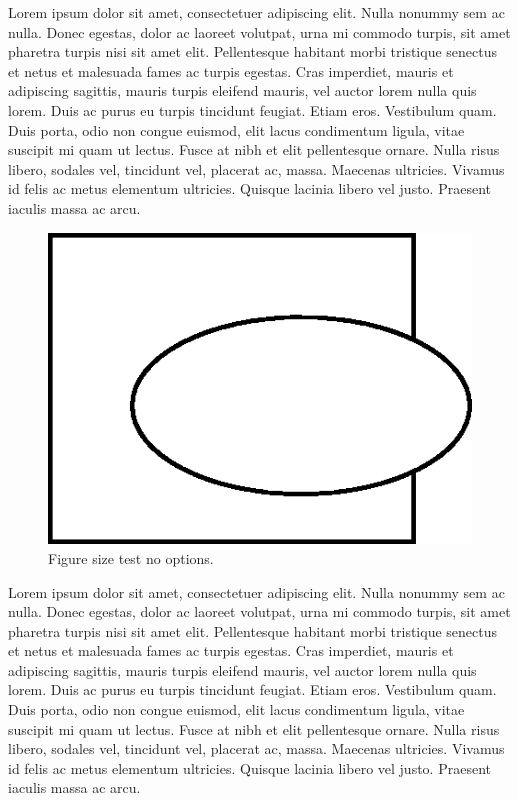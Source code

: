 \documentclass{article}
\begin{document}
Lorem ipsum dolor sit amet, consectetuer adipiscing elit. Nulla nonummy sem ac nulla. Donec egestas, dolor ac laoreet volutpat, urna mi commodo turpis, sit amet pharetra turpis nisi sit amet elit. Pellentesque habitant morbi tristique senectus et netus et malesuada fames ac turpis egestas. Cras imperdiet, mauris et adipiscing sagittis, mauris turpis eleifend mauris, vel auctor lorem nulla quis lorem. Duis ac purus eu turpis tincidunt feugiat. Etiam eros. Vestibulum quam. Duis porta, odio non congue euismod, elit lacus condimentum ligula, vitae suscipit mi quam ut lectus. Fusce at nibh et elit pellentesque ornare. Nulla risus libero, sodales vel, tincidunt vel, placerat ac, massa. Maecenas ultricies. Vivamus id felis ac metus elementum ultricies. Quisque lacinia libero vel justo. Praesent iaculis massa ac arcu.

\begin{figure}
\begin{center}
\includegraphics{fig_oval.png}
\caption{Figure size test no options.} 
\end{center}
\end{figure}

Lorem ipsum dolor sit amet, consectetuer adipiscing elit. Nulla nonummy sem ac nulla. Donec egestas, dolor ac laoreet volutpat, urna mi commodo turpis, sit amet pharetra turpis nisi sit amet elit. Pellentesque habitant morbi tristique senectus et netus et malesuada fames ac turpis egestas. Cras imperdiet, mauris et adipiscing sagittis, mauris turpis eleifend mauris, vel auctor lorem nulla quis lorem. Duis ac purus eu turpis tincidunt feugiat. Etiam eros. Vestibulum quam. Duis porta, odio non congue euismod, elit lacus condimentum ligula, vitae suscipit mi quam ut lectus. Fusce at nibh et elit pellentesque ornare. Nulla risus libero, sodales vel, tincidunt vel, placerat ac, massa. Maecenas ultricies. Vivamus id felis ac metus elementum ultricies. Quisque lacinia libero vel justo. Praesent iaculis massa ac arcu.
\end{document}
